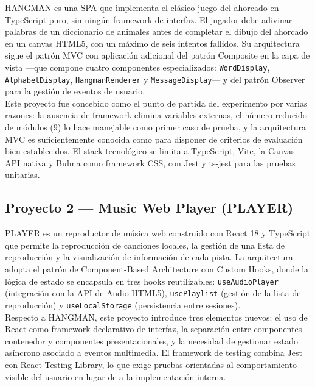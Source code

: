 \ac{HANGMAN} es una \ac{SPA} que implementa el clásico juego del ahorcado en TypeScript puro, sin ningún framework de interfaz.
El jugador debe adivinar palabras de un diccionario de animales antes de completar el dibujo del ahorcado en un canvas HTML5, con un máximo de seis intentos fallidos.
Su arquitectura sigue el patrón \ac{MVC} con aplicación adicional del patrón Composite en la capa de vista ---que compone cuatro componentes especializados: \texttt{WordDisplay}, \texttt{AlphabetDisplay}, \texttt{HangmanRenderer} y \texttt{MessageDisplay}--- y del patrón Observer para la gestión de eventos de usuario.\\

Este proyecto fue concebido como el punto de partida del experimento por varias razones: la ausencia de framework elimina variables externas, el número reducido de módulos (9) lo hace manejable como primer caso de prueba, y la arquitectura \ac{MVC} es suficientemente conocida como para disponer de criterios de evaluación bien establecidos.
El stack tecnológico se limita a TypeScript, Vite, la \ac{Canvas API} nativa y Bulma como framework CSS, con Jest y ts-jest para las pruebas unitarias.\\

\subsection{Proyecto 2 — Music Web Player (\ac{PLAYER})} \label{subsec:p2-player}

\ac{PLAYER} es un reproductor de música web construido con React 18 y TypeScript que permite la reproducción de canciones locales, la gestión de una lista de reproducción y la visualización de información de cada pista.
La arquitectura adopta el patrón de Component-Based Architecture con Custom Hooks, donde la lógica de estado se encapsula en tres hooks reutilizables: \texttt{useAudioPlayer} (integración con la \ac{API} de Audio HTML5), \texttt{usePlaylist} (gestión de la lista de reproducción) y \texttt{useLocalStorage} (persistencia entre sesiones).\\

Respecto a \ac{HANGMAN}, este proyecto introduce tres elementos nuevos: el uso de React como framework declarativo de interfaz, la separación entre componentes contenedor y componentes presentacionales, y la necesidad de gestionar estado asíncrono asociado a eventos multimedia.
El framework de testing combina Jest con React Testing Library, lo que exige pruebas orientadas al comportamiento visible del usuario en lugar de a la implementación interna.\\

